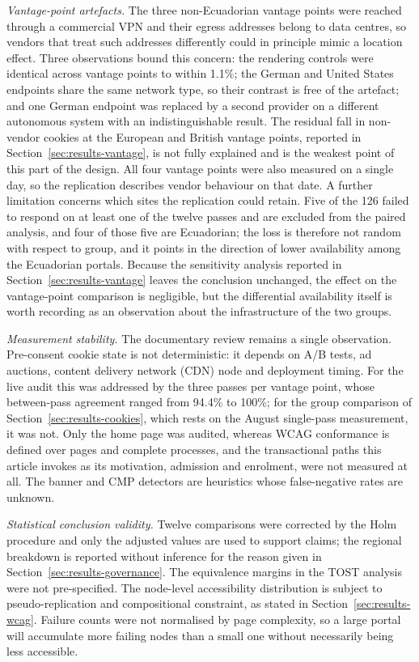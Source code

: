 \documentclass[pdflatex,sn-basic,Numbered,iicol]{sn-jnl}
\theoremstyle{thmstyleone}
\theoremstyle{thmstyletwo}
\theoremstyle{thmstylethree}
\begin{document}
	\emph{Vantage-point artefacts.} The three non-Ecuadorian vantage points were reached through a commercial VPN and their egress addresses belong to data centres, so vendors that treat such addresses differently could in principle mimic a location effect. Three observations bound this concern: the rendering controls were identical across vantage points to within 1.1\%; the German and United States endpoints share the same network type, so their contrast is free of the artefact; and one German endpoint was replaced by a second provider on a different autonomous system with an indistinguishable result. The residual fall in non-vendor cookies at the European and British vantage points, reported in Section~\ref{sec:results-vantage}, is not fully explained and is the weakest point of this part of the design. All four vantage points were also measured on a single day, so the replication describes vendor behaviour on that date. A further limitation concerns which sites the replication could retain. Five of the 126 failed to respond on at least one of the twelve passes and are excluded from the paired analysis, and four of those five are Ecuadorian; the loss is therefore not random with respect to group, and it points in the direction of lower availability among the Ecuadorian portals. Because the sensitivity analysis reported in Section~\ref{sec:results-vantage} leaves the conclusion unchanged, the effect on the vantage-point comparison is negligible, but the differential availability itself is worth recording as an observation about the infrastructure of the two groups.
	
	\emph{Measurement stability.} The documentary review remains a single observation. Pre-consent cookie state is not deterministic: it depends on A/B tests, ad auctions, content delivery network (CDN) node and deployment timing. For the live audit this was addressed by the three passes per vantage point, whose between-pass agreement ranged from 94.4\% to 100\%; for the group comparison of Section~\ref{sec:results-cookies}, which rests on the August single-pass measurement, it was not. Only the home page was audited, whereas WCAG conformance is defined over pages and complete processes, and the transactional paths this article invokes as its motivation, admission and enrolment, were not measured at all. The banner and CMP detectors are heuristics whose false-negative rates are unknown.
	
	\emph{Statistical conclusion validity.} Twelve comparisons were corrected by the Holm procedure and only the adjusted values are used to support claims; the regional breakdown is reported without inference for the reason given in Section~\ref{sec:results-governance}. The equivalence margins in the TOST analysis were not pre-specified. The node-level accessibility distribution is subject to pseudo-replication and compositional constraint, as stated in Section~\ref{sec:results-wcag}. Failure counts were not normalised by page complexity, so a large portal will accumulate more failing nodes than a small one without necessarily being less accessible.
	
\end{document}
